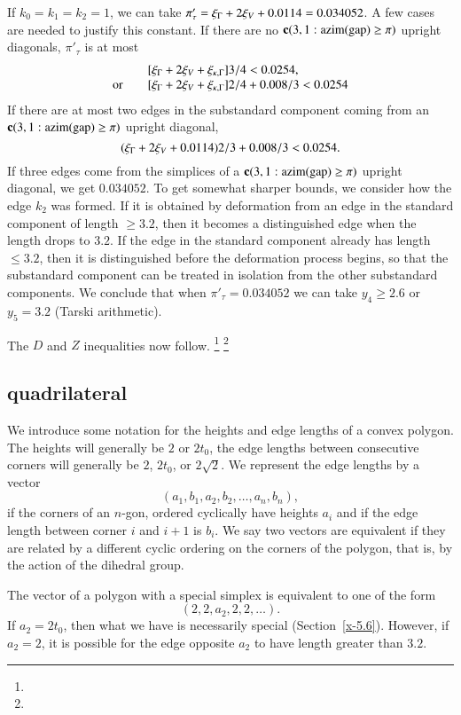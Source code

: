 If $k_0=k_1=k_2=1$, we can take $\pi'_\tau=
\xi_\Gamma+2\xi_V+0.0114=0.034052$. A few cases are needed to justify
this constant. If there are no ${\operatorname{\bf c}}{(3,1: {\operatorname{azim}}({\operatorname{gap}}) \ge \pi)}$ upright diagonals,
$\pi'_\tau$ is at most
    $$
    \begin{array}{lll}
    &[\xi_\Gamma + 2 \xi_V +\xi_{\kappa,\Gamma} ]3/4 < 0.0254,\\
    \hbox{or\quad }&[\xi_\Gamma+2\xi_V+\xi_{\kappa,\Gamma}]2/4 + 0.008/3 < 0.0254
    \end{array}
    $$
If there are at most two edges in the substandard component coming from an
${\operatorname{\bf c}}{(3,1: {\operatorname{azim}}({\operatorname{gap}}) \ge \pi)}$ upright diagonal,
    $$(\xi_\Gamma+2\xi_V+0.0114)2/3 + 0.008/3 < 0.0254.$$
If three edges come from the simplices of a ${\operatorname{\bf c}}{(3,1: {\operatorname{azim}}({\operatorname{gap}}) \ge \pi)}$ upright
diagonal, we get $0.034052$. To get somewhat sharper bounds, we
consider how the edge $k_2$ was formed.  If it is obtained by
deformation from an edge in the standard component of length
$\ge3.2$, then it becomes a distinguished edge when the length
drops to $3.2$.  If the edge in the standard component already has
length $\le3.2$, then it is distinguished before the deformation
process begins, so that the substandard component can be treated in isolation
from the other substandard components. We conclude that when
$\pi'_\tau=0.034052$ we can take $y_4\ge2.6$ or $y_5=3.2$
(Tarski arithmetic).

The $D$ and $Z$ inequalities now follow.%
\footnote{} %
\footnote{} %

\subsection{quadrilateral} %

We introduce some notation for the heights and edge lengths of a convex
polygon.  The heights will generally be $2$ or $2t_0$, the edge lengths
between consecutive corners will generally be $2$, $2t_0$, or
$2\sqrt{2}$.  We represent the edge lengths by a vector
    $$(a_1,b_1,a_2,b_2,\ldots,a_n,b_n),$$
if the corners of an $n$-gon, ordered cyclically have heights $a_i$ and
if the edge length between corner $i$ and $i+1$ is $b_i$.  We say two
vectors are equivalent if they are related by a different cyclic
ordering on the corners of the polygon, that is, by the action of the
dihedral group.

The vector of a polygon with a special simplex is equivalent to one of
the form
    $$(2,2,a_2,2,2,\ldots).$$  If $a_2=2t_0$, then what we have is
necessarily special (Section~\ref{x-5.6}). However, if $a_2=2$, it is
possible for the edge opposite $a_2$ to have length greater than $3.2$.


